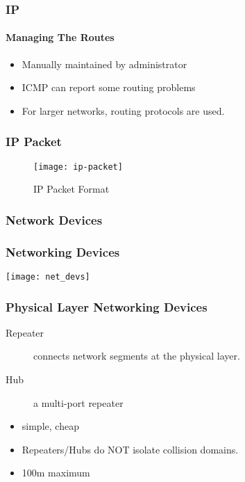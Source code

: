\documentclass[hyperref={xetex,colorlinks,linkcolor=blue},green,compress]{beamer}
\begin{document}
  \begin{frame}
    \frametitle{IP} \framesubtitle{Managing The Routes}
    \begin{itemize}
    \item Manually maintained by administrator
    \item ICMP can report some routing problems
    \item For larger networks, routing protocols are used.
    \end{itemize}
  \end{frame}

  \begin{frame}
    \frametitle{IP Packet}
    \begin{figure}
      \centering
      \texttt{[image: ip-packet]}
      \caption{IP Packet Format}
      \label{fig:ip-packet-format}
    \end{figure}
  \end{frame}

  \subsubsection{Network Devices}

  \begin{frame} \frametitle{Networking Devices}
    \texttt{[image: net\_devs]}
  \end{frame}
  
  
  \begin{frame} \frametitle{Physical Layer Networking Devices}
    \begin{description}
    \item[Repeater] connects network segments at the physical layer.\pause
    \item[Hub] a multi-port repeater \pause
    \end{description}
    \begin{itemize}
    \item simple, cheap
    \item Repeaters/Hubs do NOT isolate collision domains.
    \item 100m maximum
    \end{itemize}    
  \end{frame}
  
\end{document}
